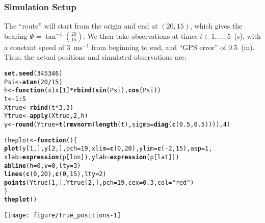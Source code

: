 \documentclass[11pt]{article}\usepackage[]{graphicx}\usepackage[]{color}
\makeatletter
\def\maxwidth{ %
  \ifdim\Gin@nat@width>\linewidth
    \linewidth
  \else
    \Gin@nat@width
  \fi
}
\newcommand{\hlnum}[1]{\textcolor[rgb]{0.686,0.059,0.569}{#1}}%
\newcommand{\hlstr}[1]{\textcolor[rgb]{0.192,0.494,0.8}{#1}}%
\newcommand{\hlopt}[1]{\textcolor[rgb]{0,0,0}{#1}}%
\newcommand{\hlstd}[1]{\textcolor[rgb]{0.345,0.345,0.345}{#1}}%
\newcommand{\hlkwa}[1]{\textcolor[rgb]{0.161,0.373,0.58}{\textbf{#1}}}%
\newcommand{\hlkwb}[1]{\textcolor[rgb]{0.69,0.353,0.396}{#1}}%
\newcommand{\hlkwc}[1]{\textcolor[rgb]{0.333,0.667,0.333}{#1}}%
\newcommand{\hlkwd}[1]{\textcolor[rgb]{0.737,0.353,0.396}{\textbf{#1}}}%
\newenvironment{kframe}{%
 \def\at@end@of@kframe{}%
 \ifinner\ifhmode%
  \def\at@end@of@kframe{\end{minipage}}%
  \begin{minipage}{\columnwidth}%
 \fi\fi%
 \def\FrameCommand##1{\hskip\@totalleftmargin \hskip-\fboxsep
 \colorbox{shadecolor}{##1}\hskip-\fboxsep
     \hskip-\linewidth \hskip-\@totalleftmargin \hskip\columnwidth}%
 \MakeFramed {\advance\hsize-\width
   \@totalleftmargin\z@ \linewidth\hsize
   \@setminipage}}%
 {\par\unskip\endMakeFramed%
 \at@end@of@kframe}
\newenvironment{knitrout}{}{} %
\makeatother
\begin{document}
\subsubsection{Simulation Setup}

The ``route'' will start from the origin and end at $\left(20, 15\right)$,
which gives the bearing $\Psi = \tan^{-1}\left(\frac{20}{15}\right)$. 
We then take observations at times $t \in 1, \ldots, 5$~(s), with a constant speed of 3~ms$^{-1}$ from beginning to
end, and ``GPS error'' of 0.5~(m). Thus, the actual positions and simulated observations are:
\begin{knitrout}
\color{fgcolor}\begin{kframe}
\begin{alltt}
\hlkwd{set.seed}\hlstd{(}\hlnum{345346}\hlstd{)}
\hlstd{Psi} \hlkwb{<-} \hlkwd{atan}\hlstd{(}\hlnum{20}\hlopt{/}\hlnum{15}\hlstd{)}
\hlstd{h} \hlkwb{<-} \hlkwa{function}\hlstd{(}\hlkwc{x}\hlstd{) x[}\hlnum{1}\hlstd{]} \hlopt{*} \hlkwd{rbind}\hlstd{(}\hlkwd{sin}\hlstd{(Psi),} \hlkwd{cos}\hlstd{(Psi))}
\hlstd{t} \hlkwb{<-} \hlnum{1}\hlopt{:}\hlnum{5}
\hlstd{Xtrue} \hlkwb{<-} \hlkwd{rbind}\hlstd{(t} \hlopt{*} \hlnum{3}\hlstd{,} \hlnum{3}\hlstd{)}
\hlstd{Ytrue} \hlkwb{<-} \hlkwd{apply}\hlstd{(Xtrue,} \hlnum{2}\hlstd{, h)}
\hlstd{y} \hlkwb{<-} \hlkwd{round}\hlstd{(Ytrue} \hlopt{+} \hlkwd{t}\hlstd{(}\hlkwd{rmvnorm}\hlstd{(}\hlkwd{length}\hlstd{(t),} \hlkwc{sigma} \hlstd{=} \hlkwd{diag}\hlstd{(}\hlkwd{c}\hlstd{(}\hlnum{0.5}\hlstd{,} \hlnum{0.5}\hlstd{)))),} \hlnum{4}\hlstd{)}

\hlstd{theplot} \hlkwb{<-} \hlkwa{function}\hlstd{() \{}
    \hlkwd{plot}\hlstd{(y[}\hlnum{1}\hlstd{, ], y[}\hlnum{2}\hlstd{, ],} \hlkwc{pch} \hlstd{=} \hlnum{19}\hlstd{,} \hlkwc{xlim} \hlstd{=} \hlkwd{c}\hlstd{(}\hlnum{0}\hlstd{,} \hlnum{20}\hlstd{),} \hlkwc{ylim} \hlstd{=} \hlkwd{c}\hlstd{(}\hlopt{-}\hlnum{2}\hlstd{,} \hlnum{15}\hlstd{),} \hlkwc{asp} \hlstd{=} \hlnum{1}\hlstd{,}
         \hlkwc{xlab} \hlstd{=} \hlkwd{expression}\hlstd{(p[lon]),} \hlkwc{ylab} \hlstd{=} \hlkwd{expression}\hlstd{(p[lat]))}
    \hlkwd{abline}\hlstd{(}\hlkwc{h} \hlstd{=} \hlnum{0}\hlstd{,} \hlkwc{v} \hlstd{=} \hlnum{0}\hlstd{,} \hlkwc{lty} \hlstd{=} \hlnum{3}\hlstd{)}
    \hlkwd{lines}\hlstd{(}\hlkwd{c}\hlstd{(}\hlnum{0}\hlstd{,} \hlnum{20}\hlstd{),} \hlkwd{c}\hlstd{(}\hlnum{0}\hlstd{,} \hlnum{15}\hlstd{),} \hlkwc{lty} \hlstd{=} \hlnum{2}\hlstd{)}
    \hlkwd{points}\hlstd{(Ytrue[}\hlnum{1}\hlstd{, ], Ytrue[}\hlnum{2}\hlstd{, ],} \hlkwc{pch} \hlstd{=} \hlnum{19}\hlstd{,} \hlkwc{cex} \hlstd{=} \hlnum{0.3}\hlstd{,} \hlkwc{col} \hlstd{=} \hlstr{"red"}\hlstd{)}
\hlstd{\}}
\hlkwd{theplot}\hlstd{()}
\end{alltt}
\end{kframe}

{\centering \texttt{[image: figure/true\_positions-1]} 

}



\end{knitrout}
\end{document}
